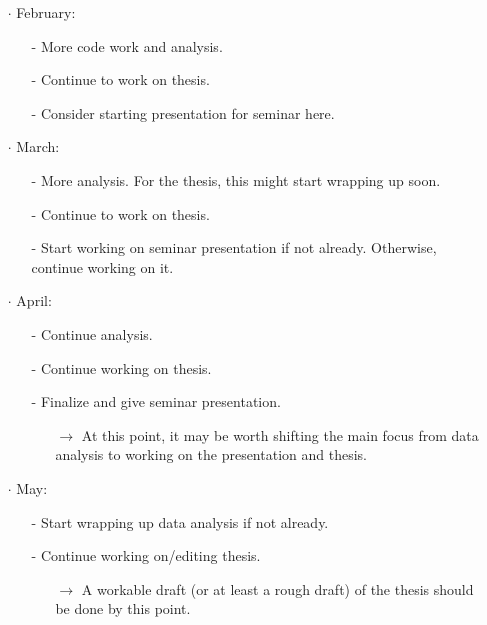 \documentclass[12pt, letterpaper]{article}
\begin{document}
\begin{itemize}
    \item[$\cdot$] February:
    \begin{itemize}
      \item[-] More code work and analysis.
      \item[-] Continue to work on thesis.
      \item[-] Consider starting presentation for seminar here.\\
    \end{itemize}
    
    \item[$\cdot$] March:
    \begin{itemize}
      \item[-] More analysis. For the thesis, this might start wrapping up soon.
      \item[-] Continue to work on thesis.
      \item[-] Start working on seminar presentation if not already. Otherwise, continue
               working on it.\\
    \end{itemize}
    
    \item[$\cdot$] April:
    \begin{itemize}
      \item[-] Continue analysis.
      \item[-] Continue working on thesis.
      \item[-] Finalize and give seminar presentation.
      \begin{itemize}
        \item[$\rightarrow$] At this point, it may be worth shifting the main focus from
                             data analysis to working on the presentation and thesis.\\
      \end{itemize}
    \end{itemize}
    
    \item[$\cdot$] May:
    \begin{itemize}
      \item[-] Start wrapping up data analysis if not already.
      \item[-] Continue working on/editing thesis.
      \begin{itemize}
        \item[$\rightarrow$] A workable draft (or at least a rough draft) of the thesis
                             should be done by this point.\\
      \end{itemize}
    \end{itemize}
    

\end{itemize}
\end{document}
